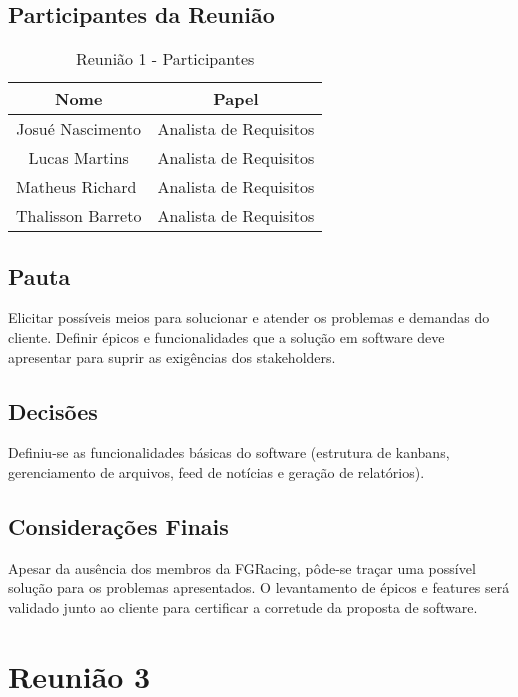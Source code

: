 \begin{apendicesenv}
\subsection{Participantes da Reunião}
\begin{table}[h]
  \centering
  \caption{Reunião 1 - Participantes}
  \begin{tabular}{|c|c|}
  \hline
  \textbf{Nome}                           & \textbf{Papel}                              \\ \hline
  Josué Nascimento                        & Analista de Requisitos                      \\ \hline
  Lucas Martins                           & Analista de Requisitos                      \\ \hline
  \multicolumn{1}{|l|}{Matheus Richard}   & \multicolumn{1}{l|}{Analista de Requisitos} \\ \hline
  \multicolumn{1}{|l|}{Thalisson Barreto} & \multicolumn{1}{l|}{Analista de Requisitos} \\ \hline
\end{tabular}
\end{table}

\subsection{Pauta}
Elicitar possíveis meios para solucionar e atender os problemas e demandas do cliente. Definir épicos e funcionalidades que a solução em software deve apresentar para suprir as exigências dos stakeholders.
\subsection{Decisões}
Definiu-se as funcionalidades básicas do software (estrutura de kanbans, gerenciamento de arquivos, feed de notícias e geração de relatórios).
\subsection{Considerações Finais}
Apesar da ausência dos membros da FGRacing, pôde-se traçar uma possível solução para os problemas apresentados. O levantamento de épicos e features será validado junto ao cliente para certificar a corretude da proposta de software.

\section{Reunião 3}

\end{apendicesenv}
